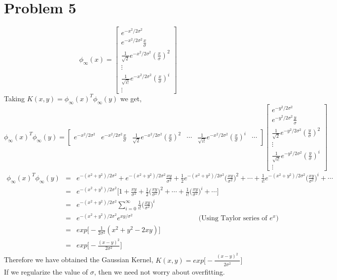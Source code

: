 \documentclass[10pt, a4paper, fleqn]{article}
\begin{document}
\section{Problem 5}
\[ \phi_\infty(x) = 
\begin{bmatrix}
e^\text{$-x^2/2\sigma^2$}\\
e^\text{$-x^2/2\sigma^2$}\frac{x}{\sigma}\\
\frac{1}{\sqrt{2}}e^\text{$-x^2/2\sigma^2$}(\frac{x}{\sigma})^2\\
\vdots \\
\frac{1}{\sqrt{i!}}e^\text{$-x^2/2\sigma^2$}(\frac{x}{\sigma})^i\\
\vdots
\end{bmatrix}\]
Taking $K(x,y) = \phi_\infty(x)^T \phi_\infty(y)$ we get,
\[ \phi_\infty(x)^T \phi_\infty(y) = 
\begin{bmatrix}
e^\text{$-x^2/2\sigma^2$}& e^\text{$-x^2/2\sigma^2$}\frac{x}{\sigma} & \frac{1}{\sqrt{2}}e^\text{$-x^2/2\sigma^2$}(\frac{x}{\sigma})^2&\cdots&\frac{1}{\sqrt{i!}}e^\text{$-x^2/2\sigma^2$}(\frac{x}{\sigma})^i&\cdots
\end{bmatrix}
\begin{bmatrix}
e^\text{$-y^2/2\sigma^2$}\\
e^\text{$-y^2/2\sigma^2$}\frac{y}{\sigma}\\
\frac{1}{\sqrt{2}}e^\text{$-y^2/2\sigma^2$}(\frac{y}{\sigma})^2\\
\vdots \\
\frac{1}{\sqrt{i!}}e^\text{$-y^2/2\sigma^2$}(\frac{y}{\sigma})^i\\
\vdots
\end{bmatrix}\]
\begin{eqnarray*}
 \phi_\infty(x)^T \phi_\infty(y) &=& 
e^\text{$-(x^2+y^2)/2\sigma^2$} +  e^\text{$-(x^2+y^2)/2\sigma^2$}\frac{xy}{\sigma^2} + \frac{1}{2}e^\text{$-(x^2+y^2)/2\sigma^2$}\Big(\frac{xy}{\sigma^2}\Big)^2 + \cdots + \frac{1}{i!}e^\text{$-(x^2+y^2)/2\sigma^2$}\Big(\frac{xy}{\sigma^2}\Big)^i + \cdots\\
&=&e^\text{$-(x^2+y^2)/2\sigma^2$}\Big[ 1 + \frac{xy}{\sigma^2} + \frac{1}{2}\Big(\frac{xy}{\sigma^2}\Big)^2 + \cdots + \frac{1}{i!}\Big(\frac{xy}{\sigma^2}\Big)^i + \cdots \Big]\\
&=&e^\text{$-(x^2+y^2)/2\sigma^2$} \sum\limits_{i=0}^{\infty}{\frac{1}{i!}\Big(\frac{xy}{\sigma^2}\Big)^i} \\
&=&e^\text{$-(x^2+y^2)/2\sigma^2$} e^\text{$xy/\sigma^2$}\ \ \ \ \ \ \ \ \ \ \ \ \ \ \ \ \ \ \ \ \ \ \ \ \ \ \ \ \ \ \ \ \ \ \ \ \ \  \ \ \ \ \ \text{(Using Taylor series of $e^x$)}\\
&=&exp\Big[ -\frac{1}{2\sigma^2} (x^2 + y^2 - 2xy) \Big]\\
&=&exp\Big[-\frac{(x-y)^2}{2\sigma^2}\Big]
\end{eqnarray*}
Therefore we have obtained the Gaussian Kernel, $K(x,y) = exp\Big[-\frac{\substack{(x-y)^2}}{\substack{2\sigma^2}}\Big]$
\\
If we regularize the value of $\sigma$, then we need not worry about overfitting.
\end{document}
